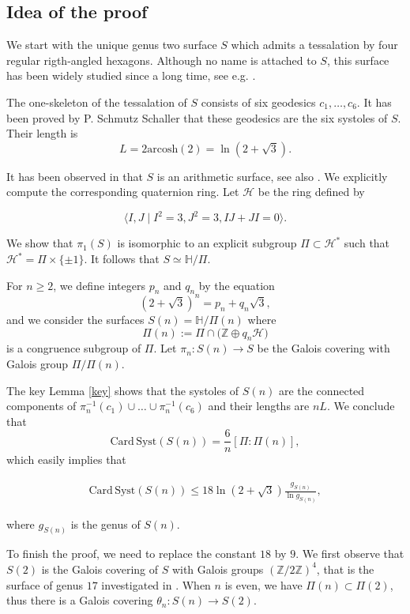 \documentclass[12pt]{amsart}
\newcommand{\HP}{\mathbb{H}}
\newcommand{\Z}{\mathbb{Z}}
\newcommand{\arcosh}{\mathrm{arcosh}}
\newcommand{\Card}{\mathrm{Card\,}}
\newcommand{\Syst}{{\mathrm {Syst}}}
\newcommand{\cH}{\mathcal{H}}
\begin{document}
\subsection*{ Idea of the proof}

We start with the unique genus two surface $S$ which admits a tessalation by
four regular rigth-angled hexagons.  Although no name is attached to $S$, this surface has been widely studied since a long time,
see e.g.  \cite{Broughton}\cite{SS}\cite{Harvey}\cite{KuuNaa}.

The one-skeleton of the tessalation of $S$ consists of six geodesics
$c_1,\ldots,c_6$. It has been proved by P. Schmutz Schaller \cite{SS} that 
these geodesics are the six systoles of $S$. Their length is
$$L=2\arcosh(2)=\ln(2+\sqrt{3}).$$

It has been observed in \cite{KuuNaa} that $S$ is an arithmetic surface, see
also \cite{Takeuchi}.
We explicitly compute the corresponding quaternion ring.
Let $\cH$ be the  ring  defined by

$$\langle I, J\mid I^2=3, J^2=3, IJ+JI=0\rangle.$$

\noindent We  show that $\pi_1(S)$ is
isomorphic to an explicit subgroup $\Pi\subset \cH^*$ such that
$\cH^*=\Pi\times \{\pm1\}$. It follows that
$S\simeq \HP/\Pi$.



For $n\geq 2$, we define  integers $p_n$ and $q_n$ by the equation
$$(2+\sqrt{3})^n=p_n+q_n\sqrt{3},$$
\noindent and we consider the  surfaces 
$S(n)=\HP/\Pi(n)$ where 
$$\Pi(n):=\Pi\cap \big(\Z\oplus q_n\cH)$$
\noindent is a congruence subgroup of $\Pi$. Let $\pi_n: S(n)\to S$ be the 
Galois covering  with Galois group $\Pi/\Pi(n)$.

The key Lemma \ref{key} shows that the systoles of $S(n)$  are the connected components
of $\pi_n^{-1}(c_1)\cup\ldots\cup \pi_n^{-1}(c_6)$ and their lengths are
$nL$. We conclude that
$$\Card \Syst(S(n))=\frac{6}{n}[\Pi:\Pi(n)],$$
\noindent which easily implies that 

\begin{align}
\Card \Syst(S(n))\leq 18\ln(2+\sqrt{3}) \frac{g_{S(n)}}{\ln g_{S(n)}}, \label{inequation18}
\end{align}

\noindent where $g_{S(n)}$ is the genus of $S(n)$.

To finish the proof, we need to replace the constant $18$ by $9$.
We first observe that $S(2)$ is the  Galois covering
of $S$ with Galois groups $(\Z/2\Z)^4$, that is the surface of genus $17$ investigated in \cite{Mathieu}. When $n$ is even,
we have $\Pi(n)\subset\Pi(2)$, thus there is a Galois covering $\theta_n: S(n)\to S(2)$. 
\end{document}
